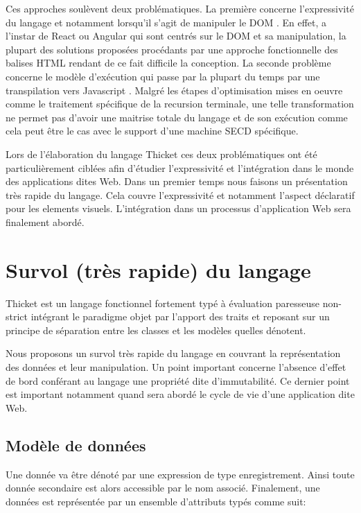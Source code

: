 \documentclass[twoside,a4paper]{article}
\begin{document}
Ces  approches soulèvent  deux problématiques.   La première  concerne
l'expressivité du  langage et notamment lorsqu'il  s'agit de manipuler
le  DOM \cite{dom}.   En effet,  a l'instar  de React  \cite{react} ou
Angular  \cite{angularjs}   qui  sont  centrés   sur  le  DOM   et  sa
manipulation,  la plupart  des solutions  proposées procédants  par une
approche fonctionnelle des  balises HTML rendant de  ce fait difficile
la conception.  La seconde problème concerne le modèle d'exécution qui
passe par  la plupart du  temps par une transpilation  vers Javascript
\cite{javascript}.  Malgré  les étapes d’optimisation mises  en oeuvre
comme le  traitement spécifique de  la recursion terminale,  une telle
transformation ne permet pas d’avoir une maitrise totale du langage et
de son  exécution comme cela  peut être le  cas avec le  support d’une
machine SECD spécifique.

Lors  de  l'élaboration du  langage  Thicket  \cite{thicket} ces  deux
problématiques  ont   été  particulièrement  ciblées   afin  d'étudier
l'expressivité et  l'intégration dans le monde  des applications dites
Web.  Dans un  premier temps nous faisons un  présentation très rapide
du  langage.   Cela  couvre   l'expressivité  et   notamment  l'aspect
déclaratif pour les elements visuels.  L'intégration dans un processus
d'application Web sera finalement abordé.

\section{Survol (très rapide) du langage}

Thicket  est  un  langage  fonctionnel  fortement  typé  à  évaluation
paresseuse non-strict  intégrant le  paradigme objet par  l'apport des
traits \cite{trait}  et reposant sur  un principe de  séparation entre
les classes et les modèles quelles dénotent.

Nous  proposons  un survol  très  rapide  du  langage en  couvrant  la
représentation des  données et  leur manipulation. Un  point important
concerne l'absence d'effet de bord conférant au langage une propriété
dite d'immutabilité.  Ce dernier  point est important  notamment quand
sera abordé le cycle de vie d'une application dite Web.

\subsection{Modèle de données}

Une donnée va être dénoté par  une expression de type enregistrement.
Ainsi  toute  donnée  secondaire  est  alors  accessible  par  le  nom
associé.  Finalement,  une données  est  représentée  par un  ensemble
d'attributs typés comme suit:
\end{document}
